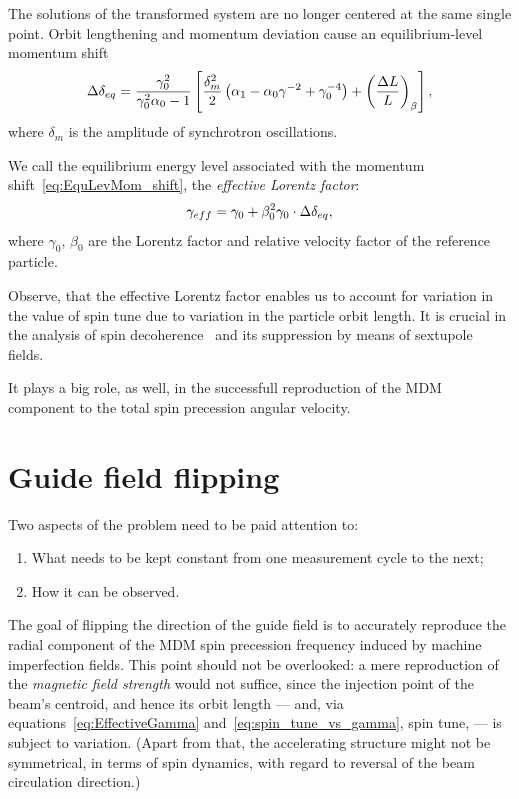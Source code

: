 \documentclass[a4paper]{jacow}
\newcommand{\w}{\omega}
\newcommand{\D}{\Delta}
\begin{document}
The solutions of the transformed system are no longer centered at the same single point. Orbit lengthening
and momentum deviation cause an equilibrium-level momentum shift~\cite[p.~2581]{Senichev:IPAC13}
\begin{equation}\label{eq:EquLevMom_shift}
\Delta\delta_{eq} = \frac{\gamma_0^2}{\gamma_0^2\alpha_0 - 1}\bkt*{\frac{\delta_m^2}{2}\bkt{\alpha_1 - \alpha_0\gamma^{-2} + \gamma_0^{-4}} + \bkt{\frac{\Delta L}{L}}_\beta},
\end{equation}
where $\delta_m$ is the amplitude of synchrotron oscillations.

We call the equilibrium energy level associated with the momentum shift~\eqref{eq:EquLevMom_shift},
the \emph{effective Lorentz factor}:
\begin{equation}\label{eq:EffectiveGamma}
\g*= \gamma_0 + \beta_0^2\gamma_0\cdot\Delta\delta_{eq},
\end{equation}
where $\gamma_0$, $\beta_0$ are the Lorentz factor and relative velocity factor of the reference particle.

Observe, that the effective Lorentz factor enables us to account for variation in the value of spin tune
due to variation in the particle orbit length. It is crucial in the analysis of
spin decoherence~\cite{Aksentev:IPAC19:Decoh} and its suppression by means of sextupole fields.

It plays a big role, as well, in the successfull reproduction of the MDM component to the total spin precession
angular velocity.

\section{Guide field flipping}
\newcommand{\Traj}{\mathcal T}
\DeclareDocumentCommand{\Stab}{s}{\mathcal{S}\IfBooleanT{#1}{\vert_{\w_y=0}}}
\newcommand{\Fail}{\mathcal F}
\renewcommand{\D}{\mathcal D}

Two aspects of the problem need to be paid attention to:
\begin{enumerate}
\item What needs to be kept constant from one measurement cycle to the next;
\item How it can be observed.
\end{enumerate}

The goal of flipping the direction of the guide field is to accurately reproduce the radial component
of the MDM spin precession frequency induced by machine imperfection fields. This point should not be overlooked:
a mere reproduction of the \emph{magnetic field strength} would not suffice, since the injection point of the beam's centroid,
and hence its orbit length --- and, via equations~\eqref{eq:EffectiveGamma} and~\eqref{eq:spin_tune_vs_gamma}, spin tune, --- is subject to variation. (Apart from that, the accelerating structure might not be symmetrical, in terms of spin dynamics, with regard to reversal of the beam circulation direction.)
\end{document}
